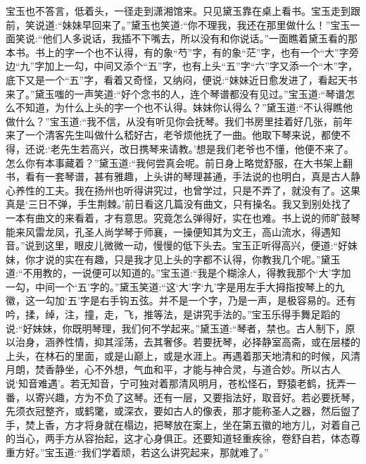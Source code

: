 \begin{parag}
    宝玉也不答言，低着头，一径走到潇湘馆来。只见黛玉靠在桌上看书。宝玉走到跟前，笑说道:“妹妹早回来了。”黛玉也笑道:“你不理我，我还在那里做什么！”宝玉一面笑说:“他们人多说话，我插不下嘴去，所以没有和你说话。”一面瞧着黛玉看的那本书。书上的字一个也不认得，有的象“芍”字，有的象“茫”字，也有一个“大”字旁边“九”字加上一勾，中间又添个“五”字，也有上头“五”字“六”字又添一个“木”字，底下又是一个“五”字，看着又奇怪，又纳闷，便说:“妹妹近日愈发进了，看起天书来了。”黛玉嗤的一声笑道:“好个念书的人，连个琴谱都没有见过。”宝玉道:“琴谱怎么不知道，为什么上头的字一个也不认得。妹妹你认得么？”黛玉道:“不认得瞧他做什么？”宝玉道:“我不信，从没有听见你会抚琴。我们书房里挂着好几张，前年来了一个清客先生叫做什么嵇好古，老爷烦他抚了一曲。他取下琴来说，都使不得，还说:‘老先生若高兴，改日携琴来请教。’想是我们老爷也不懂，他便不来了。怎么你有本事藏着？”黛玉道:“我何尝真会呢。前日身上略觉舒服，在大书架上翻书，看有一套琴谱，甚有雅趣，上头讲的琴理甚通，手法说的也明白，真是古人静心养性的工夫。我在扬州也听得讲究过，也曾学过，只是不弄了，就没有了。这果真是‘三日不弹，手生荆棘。’前日看这几篇没有曲文，只有操名。我又到别处找了一本有曲文的来看着，才有意思。究竟怎么弹得好，实在也难。书上说的师旷鼓琴能来风雷龙凤，孔圣人尚学琴于师襄，一操便知其为文王，高山流水，得遇知音。”说到这里，眼皮儿微微一动，慢慢的低下头去。宝玉正听得高兴，便道:“好妹妹，你才说的实在有趣，只是我才见上头的字都不认得，你教我几个呢。”黛玉道:“不用教的，一说便可以知道的。”宝玉道:“我是个糊涂人，得教我那个‘大’字加一勾，中间一个‘五’字的。”黛玉笑道:“这‘大’字‘九’字是用左手大拇指按琴上的九徽，这一勾加‘五’字是右手钩五弦。并不是一个字，乃是一声，是极容易的。还有吟，揉，绰，注，撞，走，飞，推等法，是讲究手法的。”宝玉乐得手舞足蹈的说:“好妹妹，你既明琴理，我们何不学起来。”黛玉道:“琴者，禁也。古人制下，原以治身，涵养性情，抑其淫荡，去其奢侈。若要抚琴，必择静室高斋，或在层楼的上头，在林石的里面，或是山巅上，或是水涯上。再遇着那天地清和的时候，风清月朗，焚香静坐，心不外想，气血和平，才能与神合灵，与道合妙。所以古人说‘知音难遇’。若无知音，宁可独对着那清风明月，苍松怪石，野猿老鹤，抚弄一番，以寄兴趣，方为不负了这琴。还有一层，又要指法好，取音好。若必要抚琴，先须衣冠整齐，或鹤氅，或深衣，要如古人的像表，那才能称圣人之器，然后盥了手，焚上香，方才将身就在榻边，把琴放在案上，坐在第五徽的地方儿，对着自己的当心，两手方从容抬起，这才心身俱正。还要知道轻重疾徐，卷舒自若，体态尊重方好。”宝玉道:“我们学着顽，若这么讲究起来，那就难了。”
\end{parag}


